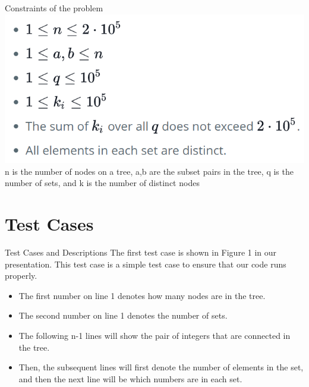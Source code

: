 \documentclass{beamer}
\begin{document}
\begin{frame}{Constraints of the problem}
\includegraphics[scale=.7]{constraintskitty.PNG}
\vspace{.5cm}
\\n is the number of nodes on a tree, a,b are the subset pairs in the tree, q is the number of sets, and k is the number of distinct nodes
\end{frame}

\section{Test Cases}
\begin{frame}{Test Cases and Descriptions}
The first test case is shown in Figure 1 in our presentation. This test case is a simple test case to ensure that our code runs properly.
\begin{itemize}
    \item The first number on line 1 denotes how many nodes are in the tree. 
    \item The second number on line 1 denotes the number of sets. 
    \item The following n-1 lines will show the pair of integers that are connected in the tree. 
    \item Then, the subsequent lines will first denote the number of elements in the set, and then the next line will be which numbers are in each set.
\end{itemize}
\end{frame}
\end{document}
